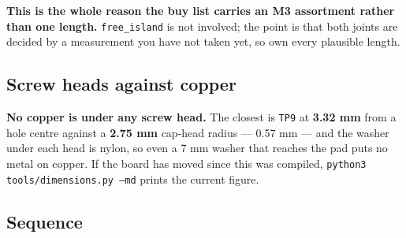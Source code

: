 \documentclass[11pt,a4paper]{article}
\newcommand{\file}[1]{\texttt{\small #1}}
\newcommand{\cmd}[1]{\texttt{\small #1}}
\begin{document}
\textbf{This is the whole reason the buy list carries an M3 assortment rather than one
length.} \file{free\_island} is not involved; the point is that both joints are decided by
a measurement you have not taken yet, so own every plausible length.

\subsection{Screw heads against copper}

\textbf{No copper is under any screw head.} The closest is \file{TP9} at \textbf{3.32 mm}
from a hole centre against a \textbf{2.75 mm} cap-head radius --- 0.57 mm --- and the washer
under each head is nylon, so even a 7 mm washer that reaches the pad puts no metal on
copper. If the board has moved since this was compiled, \cmd{python3 tools/dimensions.py
--md} prints the current figure.

\subsection{Sequence}
\end{document}
